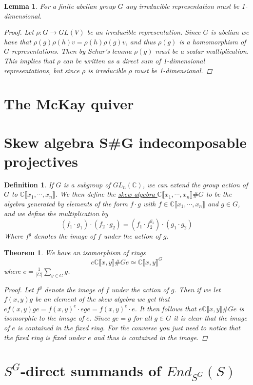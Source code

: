 \documentclass[11pt, a4paper, norsk]{article}
\newtheorem*{lemma}{Lemma}
\newtheorem*{theorem}{Theorem}
\newtheorem*{defin}{Definition}
\newcommand{\C}{\mathbb{C}}
\begin{document}
\begin{lemma}
For a finite abelian group $G$ any irreducible representation must be 1-dimensional.
\begin{proof}
Let $\rho: G \to GL(V)$ be an irreducible representation. Since $G$ is abelian we have that $\rho(g)\rho(h)v = \rho(h)\rho(g)v$, and thus $\rho(g)$ is a homomorphism of $G$-representations. Then by Schur's lemma $\rho(g)$ must be a scalar multiplication. This implies that $\rho$ can be written as a direct sum of 1-dimensional representations, but since $\rho$ is irreducible $\rho$ must be 1-dimensional.
\end{proof}
\end{lemma}

\section*{The McKay quiver}

\section*{Skew algebra S\#G indecomposable projectives}
\begin{defin}
If $G$ is a subgroup of $GL_n(\C)$, we can extend the group action of $G$ to $\C\llbracket x_1, \cdots, x_n\rrbracket$. We then define the \underline{skew algebra $\C \llbracket x_1, \cdots, x_n \rrbracket \# G$} to be the algebra generated by elements of the form $f \cdot g$ with $f \in \C\llbracket x_1, \cdots, x_n\rrbracket$ and $g \in G$, and we define the multiplication by
$$ (f_1 \cdot g_1) \cdot (f_2 \cdot g_2) = (f_1 \cdot f_2^{g_1}) \cdot (g_1 \cdot g_2) $$
Where $f^g$ denotes the image of $f$ under the action of $g$.
\end{defin}

\begin{theorem}
We have an isomorphism of rings
$$ e \C\llbracket x, y \rrbracket \# G e \simeq \C\llbracket x, y \rrbracket^G $$
where $e = \frac{1}{|G|} \sum_{g \in G} g$.

\begin{proof}
Let $f^g$ denote the image of $f$ under the action of $g$. Then if we let $f(x,y)g$ be an element of the skew algebra we get that $e f(x,y)g e = f(x, y)^e \cdot ege = f(x, y)^e \cdot e$. It then follows that $  e \C\llbracket x, y\rrbracket \# G e$ is isomorphic to the image of $e$. Since $ge=g$ for all $g\in G$ it is clear that the image of $e$ is contained in the fixed ring. For the converse you just need to notice that the fixed ring is fixed under $e$ and thus is contained in the image.
\end{proof}
\end{theorem}

\section*{$S^G$-direct summands of $End_{S^G}(S)$}
\end{document}
